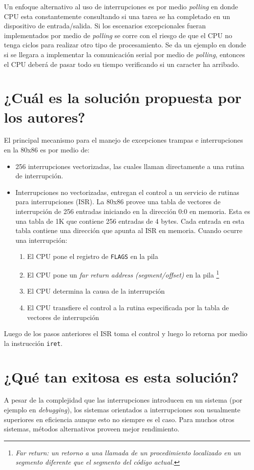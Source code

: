 Un enfoque alternativo al uso de interrupciones es por medio \textit{polling} en donde CPU esta constantemente consultando si una tarea se ha completado en un dispositivo de entrada/salida. Si los escenarios excepcionales fueran implementados por medio de \textit{polling} se corre con el riesgo de que el CPU no tenga ciclos para realizar otro tipo de procesamiento. Se da un ejemplo en donde si se llegara a implementar la comunicación serial por medio de \textit{polling}, entonces el CPU deberá de pasar todo su tiempo verificando si un caracter ha arribado.

\section{¿Cuál es la solución propuesta por los autores?}
El principal mecanismo para el manejo de excepciones trampas e interrupciones en la 80x86 es por medio de: 
\begin{itemize}
    \item 256 interrupciones vectorizadas, las cuales llaman directamente a una rutina de interrupción.
    \item Interrupciones no vectorizadas, entregan el control a un servicio de rutinas para interrupciones (ISR). La 80x86 provee una tabla de vectores de interrupción de 256 entradas iniciando en la dirección 0:0 en memoria. Esta es una tabla de 1K que contiene 256 entradas de 4 bytes. Cada entrada en esta tabla contiene una dirección que apunta al ISR en memoria. Cuando ocurre una interrupción:
    \begin{enumerate}
        \item El CPU pone el registro de \texttt{FLAGS} en la pila
        \item El CPU pone un \textit{far return address (segment/offset)} en la pila \footnote{\textit{Far return: un retorno a una llamada de un procedimiento localizado en un segmento diferente que el segmento del código actual.}}  
        \item El CPU determina la causa de la interrupción
        \item El CPU transfiere el control a la rutina especificada por la tabla de vectores de  interrupción
    \end{enumerate}
\end{itemize}
Luego de los pasos anteriores el ISR toma el control y luego lo retorna por medio la instrucción \texttt{iret}.

\section{¿Qué tan exitosa es esta solución?}
A pesar de la complejidad que las interrupciones introducen en un sistema (por ejemplo en \textit{debugging}), los sistemas orientados a interrupciones son usualmente superiores en eficiencia aunque esto no siempre es el caso. Para muchos otros sistemas, métodos alternativos proveen mejor rendimiento.




